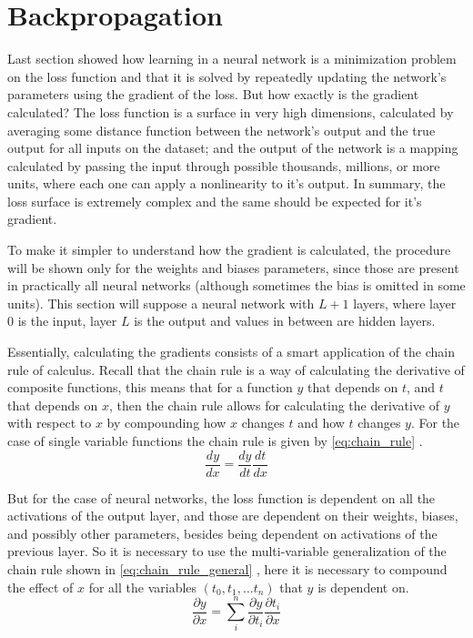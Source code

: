 \section{Backpropagation} \label{sec:backpropagation}
Last section showed how learning in a neural network is a minimization problem on the loss function and that it is solved by repeatedly updating the network's parameters using the gradient of the loss. But how exactly is the gradient calculated? The loss function is a surface in very high dimensions, calculated by averaging some distance function between the network's output and the true output for all inputs on the dataset; and the output of the network is a mapping calculated by passing the input through possible thousands, millions, or more units, where each one can apply a nonlinearity to it's output. In summary, the loss surface is extremely complex and the same should be expected for it's gradient.

To make it simpler to understand how the gradient is calculated, the procedure will be shown only for the weights and biases parameters, since those are present in practically all neural networks (although sometimes the bias is omitted in some units). This section will suppose a neural network with $L+1$ layers, where layer $0$ is the input, layer $L$ is the output and values in between are hidden layers.

Essentially, calculating the gradients consists of a smart application of the chain rule of calculus. Recall that the chain rule is a way of calculating the derivative of composite functions, this means that for a function $y$ that depends on $t$, and $t$ that depends on $x$, then the chain rule allows for calculating the derivative of $y$ with respect to $x$ by compounding how $x$ changes $t$ and how $t$ changes $y$. For the case of single variable functions the chain rule is given by \autoref{eq:chain_rule} \cite[p. 406]{calculusIII2016}.
\begin{equation} \label{eq:chain_rule}
    \frac{dy}{dx} = \frac{dy}{dt} \frac{dt}{dx}
\end{equation}

But for the case of neural networks, the loss function is dependent on all the activations of the output layer, and those are dependent on their weights, biases, and possibly other parameters, besides being dependent on activations of the previous layer. So it is necessary to use the multi-variable generalization of the chain rule shown in \autoref{eq:chain_rule_general} \cite[p. 412]{calculusIII2016}, here it is necessary to compound the effect of $x$ for all the variables $(t_0, t_1, \dots t_n)$ that $y$ is dependent on.
\begin{equation} \label{eq:chain_rule_general}
    \frac{\partial y}{\partial x} = \sum_{i}^{n}{\frac{\partial y}{\partial t_i} \frac{\partial t_i}{\partial x}}
\end{equation}

